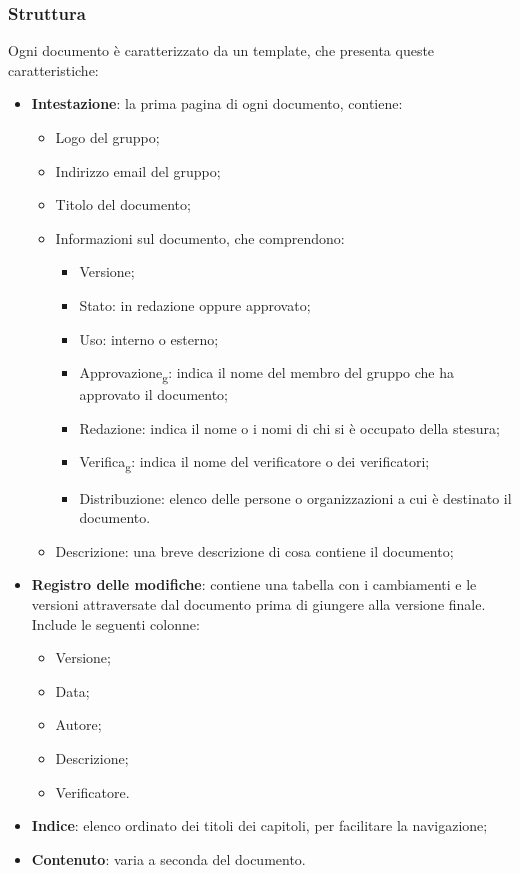 \subsubsection{Struttura}
Ogni documento è caratterizzato da un template, che presenta queste
caratteristiche:
\begin{itemize}
      \item \textbf{Intestazione}: la prima pagina di ogni documento, contiene:
            \begin{itemize}
                  \item Logo del gruppo;
                  \item Indirizzo email del gruppo;
                  \item Titolo del documento;
                  \item Informazioni sul documento, che comprendono:
                        \begin{itemize}
                              \item Versione;
                              \item Stato: in redazione oppure approvato;
                              \item Uso: interno o esterno;
                              \item Approvazione\textsubscript{g}: indica il nome del membro del gruppo che ha
                                    approvato il documento;
                              \item Redazione: indica il nome o i nomi di chi si è occupato della stesura;
                              \item Verifica\textsubscript{g}: indica il nome del verificatore o dei verificatori;
                              \item Distribuzione: elenco delle persone o organizzazioni a cui è destinato il
                                    documento.
                        \end{itemize}
                  \item Descrizione: una breve descrizione di cosa contiene il documento;
            \end{itemize}
      \item \textbf{Registro delle modifiche}: contiene una tabella con i cambiamenti e le versioni
            attraversate dal documento prima di giungere alla versione finale. Include le seguenti colonne:
            \begin{itemize}
                  \item Versione;
                  \item Data;
                  \item Autore;
                  \item Descrizione;
                  \item Verificatore.
            \end{itemize}
      \item \textbf{Indice}: elenco ordinato dei titoli dei capitoli, per facilitare la navigazione;
      \item \textbf{Contenuto}: varia a seconda del documento.
\end{itemize}
